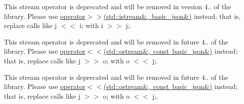 \begin{DoxyRefList}
\label{deprecated__deprecated000006}%
%
This stream operator is deprecated and will be removed in version 4.. of the library. Please use \mbox{\hyperlink{classnlohmann_1_1basic__json_aaf363408931d76472ded14017e59c9e8}{operator$>$$>$(std\+::istream\&, basic\+\_\+json\&)}} instead; that is, replace calls like {\ttfamily j $<$$<$ i;} with {\ttfamily i $>$$>$ j;}.  
\item[Member \mbox{\hyperlink{classnlohmann_1_1basic__json_a34d6a60dd99e9f33b8273a1c8db5669b}{nlohmann::basic\+\_\+json$<$ Object\+Type, Array\+Type, String\+Type, Boolean\+Type, Number\+Integer\+Type, Number\+Unsigned\+Type, Number\+Float\+Type, Allocator\+Type, J\+S\+O\+N\+Serializer $>$::operator$>$$>$}} (const \mbox{\hyperlink{classnlohmann_1_1basic__json}{basic\+\_\+json}} \&j, std\+::ostream \&o)]\label{deprecated__deprecated000002}%
%
This stream operator is deprecated and will be removed in future 4.. of the library. Please use \mbox{\hyperlink{classnlohmann_1_1basic__json_a5e34c5435e557d0bf666bd7311211405}{operator$<$$<$(std\+::ostream\&, const basic\+\_\+json\&)}} instead; that is, replace calls like {\ttfamily j $>$$>$ o;} with {\ttfamily o $<$$<$ j;}. 

\label{deprecated__deprecated000005}%
%
This stream operator is deprecated and will be removed in future 4.. of the library. Please use \mbox{\hyperlink{classnlohmann_1_1basic__json_a5e34c5435e557d0bf666bd7311211405}{operator$<$$<$(std\+::ostream\&, const basic\+\_\+json\&)}} instead; that is, replace calls like {\ttfamily j $>$$>$ o;} with {\ttfamily o $<$$<$ j;}. 
\end{DoxyRefList}